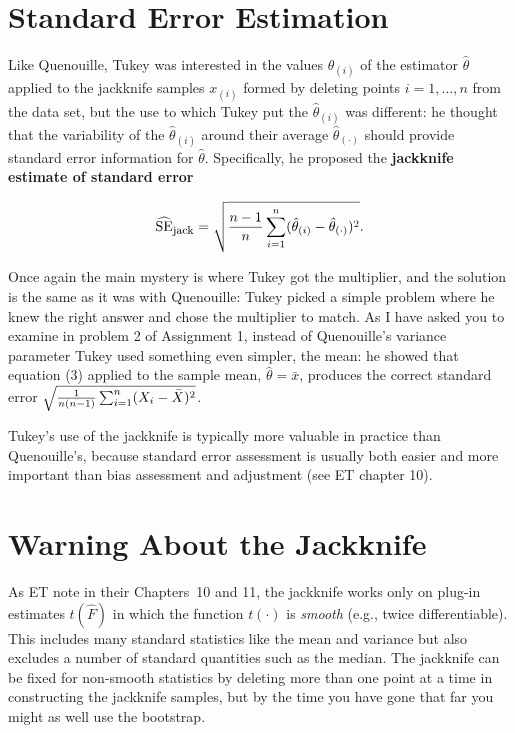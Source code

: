 \documentclass[11pt]{article}
\begin{document}
\section*{Standard Error Estimation}

Like Quenouille, Tukey was interested in the values ${\hat
\theta}_{(i)}$ of the estimator $\hat \theta$ applied to the jackknife
samples $x_{(i)}$ formed by deleting points $i = 1, \ldots, n$ from the
data set, but the use to which Tukey put the ${\hat \theta}_{(i)}$ was
different: he thought that the variability of the ${\hat \theta}_{(i)}$
around their average ${\hat \theta}_{(\cdot)}$ should provide standard
error information for $\hat \theta$. Specifically, he proposed the {\bf
jackknife estimate of standard error}

\begin{equation}
\widehat{\mbox{SE}}_{\mbox{\footnotesize jack}} = \sqrt{{{n - 1} \over
n} \sum_{i=1}^n ({\hat \theta}_{(i)} - {\hat \theta}_{(\cdot)})^2} .
\end{equation}

Once again the main mystery is where Tukey got the multiplier, and the
solution is the same as it was with Quenouille: Tukey picked a simple
problem where he knew the right answer and chose the multiplier to
match. As I have asked you to examine in problem 2 of Assignment 1,
instead of Quenouille's variance parameter Tukey used something even
simpler, the mean: he showed that equation (3) applied to the sample
mean, ${\hat \theta} = {\bar x}$, produces the correct standard error
$\sqrt{{1 \over {n(n-1)}} \sum_{i=1}^n (X_i - {\bar X})^2}$.

\pagebreak

Tukey's use of the jackknife is typically more valuable in practice than
Quenouille's, because standard error assessment is usually both easier and
more important than bias assessment and adjustment (see ET chapter 10).
\smallskip
\smallskip

\section*{Warning About the Jackknife}

As ET note in their Chapters~10 and 11, the jackknife works only on
plug-in estimates $t({\hat F})$ in which the function $t(\cdot)$ is {\it
smooth\/} (e.g., twice differentiable). This includes many standard
statistics like the mean and variance but also excludes a number of
standard quantities such as the median. The jackknife can be fixed for
non-smooth statistics by deleting more than one point at a time in
constructing the jackknife samples, but by the time you have gone that
far you might as well use the bootstrap.
\smallskip
\smallskip
\end{document}
